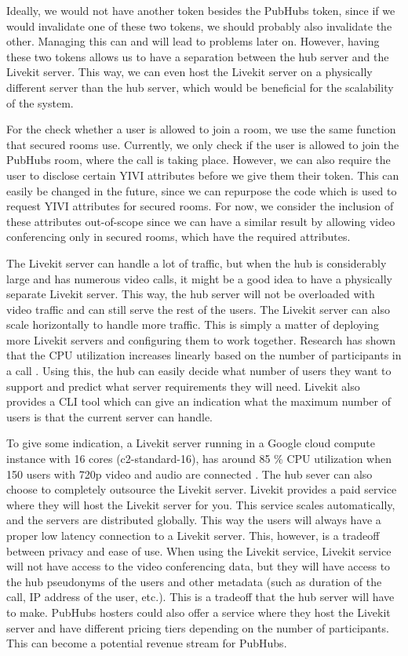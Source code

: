 \documentclass{report}
\begin{document}
Ideally, we would not have another token besides the PubHubs token, since if we would invalidate one of these two
tokens, we should probably also invalidate the other. Managing this can and will lead to problems later on. However,
having these two tokens allows us to have a separation between the hub server and the Livekit server. This way, we
can even host the Livekit server on a physically different server than the hub server, which would be beneficial for
the scalability of the system.

For the check whether a user is allowed to join a room, we use the same function that secured rooms use. Currently,
we only check if the user is allowed to join the PubHubs room, where the call is taking place. However, we can also
require the user to disclose certain YIVI attributes before we give them their token. This can easily be changed in the
future, since we can repurpose the code which is used to request YIVI attributes for secured rooms. For now, we consider
the inclusion of these attributes out-of-scope since we can have a similar result by allowing video conferencing
only in secured rooms, which have the required attributes.

The Livekit server can handle a lot of traffic, but when the hub is considerably large and has numerous video calls, it
might be a good idea to have a physically separate Livekit server. This way, the hub server will not be overloaded with
video traffic and can still serve the rest of the users. The Livekit server can also scale horizontally to handle
more traffic. This is simply a matter of deploying more Livekit servers and configuring them to work together.
Research has shown that the CPU utilization increases linearly based on the number of participants in a call
\cite{muscariello_securing_2023}. Using this, the hub can easily decide what number of users
they want to support and predict what server requirements they will need. Livekit also provides a CLI tool which
can give an indication what the maximum number of users is that the current server can handle.

To give some indication, a Livekit server running in a Google cloud compute instance with 16 cores
(c2-standard-16), has around 85 \% CPU utilization when 150 users with 720p video and audio are connected
\cite{noauthor_benchmarking_nodate}. The hub sever can also choose to completely outsource the Livekit server.
Livekit provides a paid service where they will host the Livekit server for you. This service scales
automatically, and the servers are distributed globally. This way the users will always have a proper low
latency connection to a Livekit server. This, however, is a tradeoff between privacy and ease of use. When using
the Livekit service, Livekit service will not have access to the video conferencing data, but they will have access to
the hub pseudonyms of the users and other metadata (such as duration of the call, IP address of the user, etc.). This
is a tradeoff that the hub server will have to make. PubHubs hosters could also offer a service where they host the
Livekit server and have different pricing tiers depending on the number of participants. This can become a potential
revenue stream for PubHubs.
\end{document}

